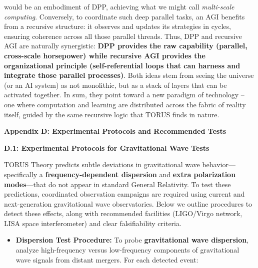 \documentclass[]{article}
\begin{document}
{\begin{itemize}
  would be an embodiment of DPP, achieving what we might call
  \emph{multi-scale computing}. Conversely, to coordinate such deep
  parallel tasks, an AGI benefits from a recursive structure: it
  observes and updates its strategies in cycles, ensuring coherence
  across all those parallel threads. Thus, DPP and recursive AGI are
  naturally synergistic: \textbf{DPP provides the raw capability
  (parallel, cross-scale horsepower) while recursive AGI provides the
  organizational principle (self-referential loops that can harness and
  integrate those parallel processes)}. Both ideas stem from seeing the
  universe (or an AI system) as not monolithic, but as a stack of layers
  that can be activated together. In sum, they point toward a new
  paradigm of technology -- one where computation and learning are
  distributed across the fabric of reality itself, guided by the same
  recursive logic that TORUS finds in nature.
\end{itemize}

\textbf{Appendix D: Experimental Protocols and Recommended Tests}

\textbf{D.1: Experimental Protocols for Gravitational Wave Tests}

TORUS Theory predicts subtle deviations in gravitational wave
behavior---specifically a \textbf{frequency-dependent dispersion} and
\textbf{extra polarization modes}---that do not appear in standard
General Relativity. To test these predictions, coordinated observation
campaigns are required using current and next-generation gravitational
wave observatories. Below we outline procedures to detect these effects,
along with recommended facilities (LIGO/Virgo network, LISA space
interferometer) and clear falsifiability criteria.

\begin{itemize}
\item
  \textbf{Dispersion Test Procedure:} To probe \textbf{gravitational
  wave dispersion}, analyze high-frequency versus low-frequency
  components of gravitational wave signals from distant mergers. For
  each detected event:


\end{itemize}}
\end{document}
